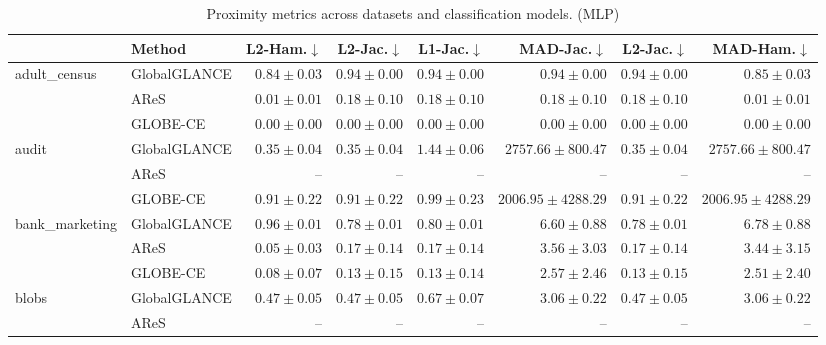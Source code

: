 \begin{table}[ht]
\centering
\caption{Proximity metrics across datasets and classification models. (MLP)}
\label{tab:proximity_metrics_mlpclassifier}
\begin{center}
\begin{sc}
\begin{scriptsize}
\begin{tabular}{l|l|rrrrrr}
\toprule
 & Method & L2-Ham.$\downarrow$ & L2-Jac.$\downarrow$ & L1-Jac.$\downarrow$ & MAD-Jac.$\downarrow$ & L2-Jac.$\downarrow$ & MAD-Ham.$\downarrow$ \\
\midrule
\multirow{3}{*}{adult\_census} & GlobalGLANCE & $0.84\pm{0.03}$ & $0.94\pm{0.00}$ & $0.94\pm{0.00}$ & $0.94\pm{0.00}$ & $0.94\pm{0.00}$ & $0.85\pm{0.03}$ \\
 & AReS & $0.01\pm{0.01}$ & $0.18\pm{0.10}$ & $0.18\pm{0.10}$ & $0.18\pm{0.10}$ & $0.18\pm{0.10}$ & $0.01\pm{0.01}$ \\
 & GLOBE-CE & $\boldsymbol{0.00\pm{0.00}}$ & $\boldsymbol{0.00\pm{0.00}}$ & $\boldsymbol{0.00\pm{0.00}}$ & $\boldsymbol{0.00\pm{0.00}}$ & $\boldsymbol{0.00\pm{0.00}}$ & $\boldsymbol{0.00\pm{0.00}}$ \\
\midrule
\multirow{3}{*}{audit} & GlobalGLANCE & $\boldsymbol{0.35\pm{0.04}}$ & $\boldsymbol{0.35\pm{0.04}}$ & $1.44\pm{0.06}$ & $2757.66\pm{800.47}$ & $\boldsymbol{0.35\pm{0.04}}$ & $2757.66\pm{800.47}$ \\
 & AReS & -- & -- & -- & -- & -- & -- \\
 & GLOBE-CE & $0.91\pm{0.22}$ & $0.91\pm{0.22}$ & $\boldsymbol{0.99\pm{0.23}}$ & $\boldsymbol{2006.95\pm{4288.29}}$ & $0.91\pm{0.22}$ & $\boldsymbol{2006.95\pm{4288.29}}$ \\
\midrule
\multirow{3}{*}{bank\_marketing} & GlobalGLANCE & $0.96\pm{0.01}$ & $0.78\pm{0.01}$ & $0.80\pm{0.01}$ & $6.60\pm{0.88}$ & $0.78\pm{0.01}$ & $6.78\pm{0.88}$ \\
 & AReS & $\boldsymbol{0.05\pm{0.03}}$ & $0.17\pm{0.14}$ & $0.17\pm{0.14}$ & $3.56\pm{3.03}$ & $0.17\pm{0.14}$ & $3.44\pm{3.15}$ \\
 & GLOBE-CE & $0.08\pm{0.07}$ & $\boldsymbol{0.13\pm{0.15}}$ & $\boldsymbol{0.13\pm{0.14}}$ & $\boldsymbol{2.57\pm{2.46}}$ & $\boldsymbol{0.13\pm{0.15}}$ & $\boldsymbol{2.51\pm{2.40}}$ \\
\midrule
\multirow{3}{*}{blobs} & GlobalGLANCE & $0.47\pm{0.05}$ & $0.47\pm{0.05}$ & $0.67\pm{0.07}$ & $3.06\pm{0.22}$ & $0.47\pm{0.05}$ & $3.06\pm{0.22}$ \\
 & AReS & -- & -- & -- & -- & -- & -- \\

\end{tabular}
\end{scriptsize}
\end{sc}
\end{center}
\end{table}
